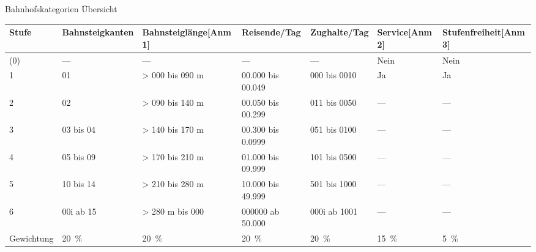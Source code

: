 \documentclass[ignorenonframetext,]{beamer}
\begin{document}
\begin{frame}{Bahnhofskategorien Übersicht}
\protect\hypertarget{bahnhofskategorien-ubersicht}{}

\begin{longtable}[]{@{}lllllll@{}}
\toprule
Stufe & Bahnsteigkanten & Bahnsteiglänge{[}Anm 1{]} & Reisende/Tag &
Zughalte/Tag & Service{[}Anm 2{]} & Stufenfreiheit{[}Anm
3{]}\tabularnewline
\midrule
\endhead
(0) & --- & --- & --- & --- & Nein & Nein\tabularnewline
1 & 01 & \textgreater{} 000 bis 090 m & 00.000 bis 00.049 & 000 bis 0010
& Ja & Ja\tabularnewline
2 & 02 & \textgreater{} 090 bis 140 m & 00.050 bis 00.299 & 011 bis 0050
& --- & ---\tabularnewline
3 & 03 bis 04 & \textgreater{} 140 bis 170 m & 00.300 bis 0.0999 & 051
bis 0100 & --- & ---\tabularnewline
4 & 05 bis 09 & \textgreater{} 170 bis 210 m & 01.000 bis 09.999 & 101
bis 0500 & --- & ---\tabularnewline
5 & 10 bis 14 & \textgreater{} 210 bis 280 m & 10.000 bis 49.999 & 501
bis 1000 & --- & ---\tabularnewline
6 & 00i ab 15 & \textgreater{} 280 m bis 000 & 000000 ab 50.000 & 000i
ab 1001 & --- & ---\tabularnewline
Gewichtung & 20~\% & 20~\% & 20~\% & 20~\% & 15~\% & 5~\%\tabularnewline
\bottomrule
\end{longtable}

\end{frame}
\end{document}
